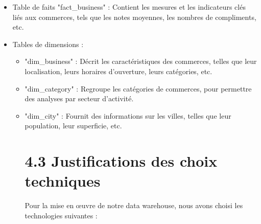 \begin{itemize}
\item Table de faits "fact\_business" : Contient les mesures et les indicateurs clés liés aux commerces, tels que les notes moyennes, les nombres de compliments, etc.
\item Tables de dimensions :
\begin{itemize}
\item "dim\_business" : Décrit les caractéristiques des commerces, telles que leur localisation, leurs horaires d’ouverture, leurs catégories, etc.
\item "dim\_category" : Regroupe les catégories de commerces, pour permettre des analyses par secteur d’activité.
\item "dim\_city" : Fournit des informations sur les villes, telles que leur population, leur superficie, etc.



\section*{4.3 Justifications des choix techniques}

Pour la mise en œuvre de notre data warehouse, nous avons choisi les technologies suivantes :

\begin{itemize}


\end{itemize}
\end{itemize}
\end{itemize}
